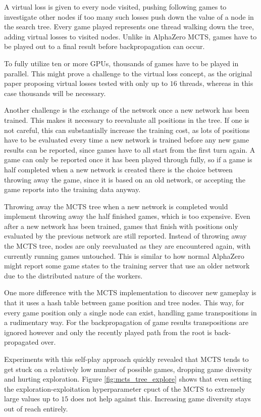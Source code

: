 \documentclass[12pt,onecolumn,oneside,titlepage]{article}
\begin{document}
A virtual loss is given to every node visited, pushing following games to investigate other nodes if too many such losses push down the value of a node in the search tree.
Every game played represents one thread walking down the tree, adding virtual losses to visited nodes. Unlike in AlphaZero MCTS, games have to be played out to a final result before backpropagation can occur. 

To fully utilize ten or more GPUs, thousands of games have to be played in parallel. This might prove a challenge to 
the virtual loss concept, as the original paper proposing virtual losses tested with only up to $16$ threads, whereas in this case thousands will be necessary.

Another challenge is the exchange of the network once a new network has been trained. This makes it necessary to reevaluate all positions in the tree. If one is not careful, this can substantially increase the training cost,
as lots of positions have to be evaluated every time a new network is trained before any new game results can be reported, since games have to all start from the first turn again. A game can only be reported once it has been played through fully,
so if a game is half completed when a new network is created there is the choice between throwing away the game, since it is based on an old network, or accepting the game reports into the training data anyway. 

Throwing away the MCTS tree when a new network 
is completed would implement throwing away the half finished games, which is too expensive.
Even after a new network has been trained, games that finish with positions only evaluated by the previous network are still reported. Instead of throwing away the MCTS tree, nodes are only reevaluated as they are encountered again,
with currently running games untouched.
This is similar to how normal AlphaZero might report some game states to the training server that use an older network due to the distributed nature of the workers.

One more difference with the MCTS implementation to discover new gameplay is that it uses a hash table between game position and tree nodes. This way, for every game position only a single node can exist, handling game transpositions in a rudimentary way. For 
the backpropagation of game results transpositions are ignored however and only the recently played path from the root is back-propagated over.

Experiments with this self-play approach quickly revealed that MCTS tends to get stuck on a relatively low number of possible games, dropping game diversity and hurting exploration. 
Figure \ref{fig:mcts_tree_explore} shows that even setting the exploration-exploitation hyperparameter cpuct of the MCTS to extremely large values up to $15$ does not help against this.
Increasing game diversity stays out of reach entirely.
\end{document}
